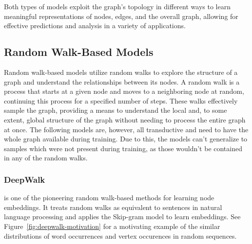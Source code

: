 Both types of models exploit the graph's topology in different ways to learn meaningful representations of nodes, edges, and the overall graph, allowing for effective predictions and analysis in a variety of applications.

\subsection{Random Walk-Based Models}

Random walk-based models utilize random walks to explore the structure of a graph and understand the relationships between its nodes. A random walk is a process that starts at a given node and moves to a neighboring node at random, continuing this process for a specified number of steps. These walks effectively sample the graph, providing a means to understand the local and, to some extent, global structure of the graph without needing to process the entire graph at once. The following models are, however, all transductive and need to have the whole graph available during training. Due to this, the models can't generalize to samples which were not present during training, as those wouldn't be contained in any of the random walks.

\subsubsection{DeepWalk}

 is one of the pioneering random walk-based methods for learning node embeddings. It treats random walks as equivalent to sentences in natural language processing and applies the Skip-gram model to learn embeddings. See Figure~\ref{fig:deepwalk-motivation} for a motivating example of the similar distributions of word occurrences and vertex occurences in random sequences.

